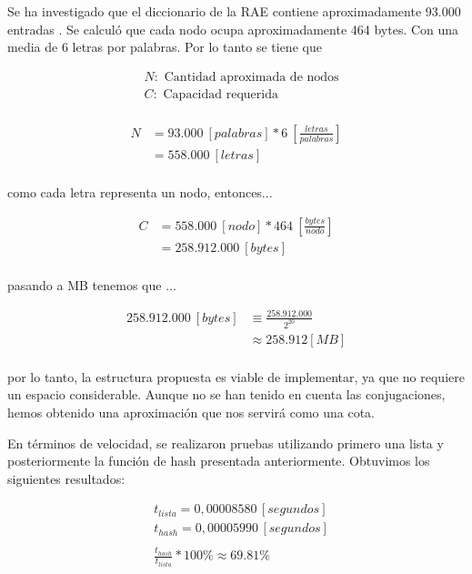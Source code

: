 \documentclass[10pt,times,twocolumn]{article}
\begin{document}
Se ha investigado que el diccionario de la RAE contiene aproximadamente 93.000 entradas \cite{rae2014}. Se calculó que cada nodo ocupa aproximadamente 464 bytes. Con una media de 6 letras por palabras. Por lo tanto se tiene que

\[
\begin{aligned}
& N: \text{ Cantidad aproximada de nodos} \\
& C: \text{ Capacidad requerida}\\
\end{aligned}
\]

\[
\begin{aligned}
N & = 93{.}000 \: \left[palabras\right] * 6 \: \left[\frac{letras}{palabras}\right]\\
& = 558{.}000 \: \left[letras\right]\\
&
\end{aligned}
\]

como cada letra representa un nodo, entonces...

\[
\begin{aligned}
C & = 558{.}000 \: \left[nodo\right] * 464 \: \left[\frac{bytes}{nodo}\right]\\
& = 258{.}912{.}000 \: \left[bytes\right]\\
&
\end{aligned}
\]

pasando a MB tenemos que ...

\[
\begin{aligned}
258{.}912{.}000 \: \left[bytes\right] & \equiv \frac{258{.}912{.}000}{2^{20}}\\
& \approx \num{258.912} \left[MB\right]\\
&
\end{aligned}
\]

por lo tanto, la estructura propuesta es viable de implementar, ya que no requiere un espacio considerable.
Aunque no se han tenido en cuenta las conjugaciones, hemos obtenido una aproximación que nos servirá como una cota.

En términos de velocidad, se realizaron pruebas utilizando primero una lista y posteriormente la función de hash presentada anteriormente. Obtuvimos los siguientes resultados:

\[
\begin{aligned}
& t_{lista}=0,00008580 \, [segundos]\\
& t_{hash}=0,00005990 \, [segundos]\\\\
& \frac{t_{hash}}{t_{lista}}*100\% \approx 69.81\%
\end{aligned}
\]
\end{document}
